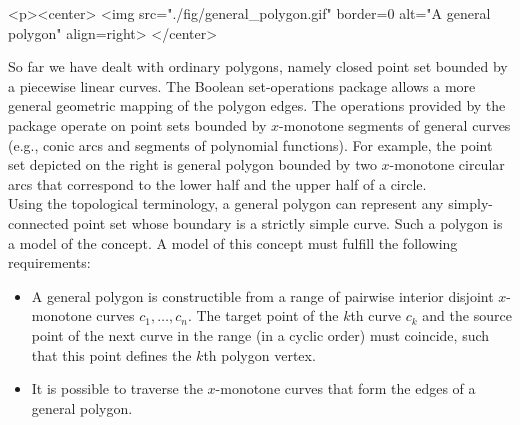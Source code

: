 \lcTex{%
  \setlength{\widthRight}{1.4cm}
  \setlength{\widthLeft}{\widthLineReal}
  \addtolength{\widthLeft}{-\widthRight}
  \begin{minipage}{\widthLeft}
}
\label{fig:general_polygon}
\begin{ccHtmlOnly}
  <p><center>
    <img src="./fig/general_polygon.gif" border=0 alt="A general polygon" align=right>
  </center>
\end{ccHtmlOnly}
So far we have dealt with ordinary polygons, namely closed point set bounded
by a piecewise linear curves. The Boolean set-operations package allows
a more general geometric mapping of the polygon edges. The operations provided
by the package operate on point sets bounded by $x$-monotone segments of
general curves (e.g., conic arcs and segments of polynomial functions).
For example, the point set depicted on the right is general polygon bounded
by two $x$-monotone circular arcs that correspond to the lower half and the
upper half of a circle.
\\

Using the topological terminology, a general polygon can represent any
simply-connected point set whose boundary is a strictly simple curve.
Such a polygon is a model of the  concept. A model
of this concept must fulfill the following requirements:
\begin{itemize}
\item A general polygon is constructible from a range of pairwise interior
disjoint $x$-monotone curves $c_1, \ldots, c_n$. The target point of the $k$th
curve $c_k$ and the source point of the next curve in the range (in a cyclic
order) must coincide, such that this point defines the $k$th polygon vertex.
\item It is possible to traverse the $x$-monotone curves that form the edges
of a general polygon.
\end{itemize}

